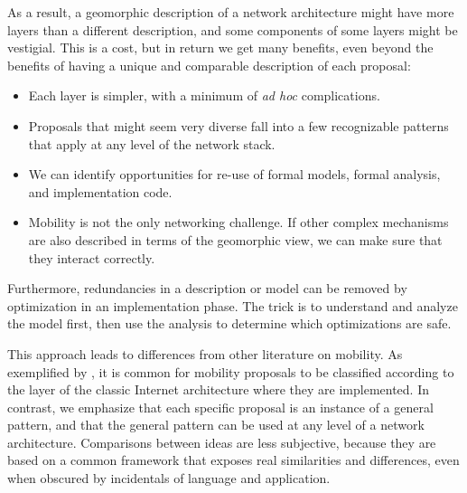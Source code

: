 As a result, a geomorphic description of a network architecture might have
more layers than a different description, and some components of some
layers might be vestigial.
This is a cost, but in return we get many benefits, even beyond the
benefits of having a unique and comparable description of each proposal:
\begin{itemize}
\item
Each layer is simpler, with a minimum of {\it ad hoc} complications.
\item
Proposals that might seem very diverse fall into a few recognizable
patterns that apply at any level of the network stack.
\item
We can identify opportunities for re-use of formal models, 
formal analysis, and implementation code.
\item
Mobility is not the only networking challenge.
If other complex mechanisms are also described in terms of the geomorphic
view, we can make sure that they interact correctly.
\end{itemize}
Furthermore, redundancies in a description or model can be
removed by optimization in an implementation phase.
The trick is to understand and analyze the model first, then use the
analysis to determine which optimizations are safe.

This approach leads to differences from other literature on
mobility.
As exemplified by
\cite{akyildiz}, it is common for mobility proposals to be
classified according to the layer of the classic Internet architecture
where they are implemented.
In contrast, we emphasize that each specific proposal is an instance
of a general pattern, and that the general pattern can be used at any
level of a network architecture.
Comparisons between ideas are less subjective, because they are based
on a common framework that exposes real similarities and differences,
even when obscured by incidentals of language and application.
